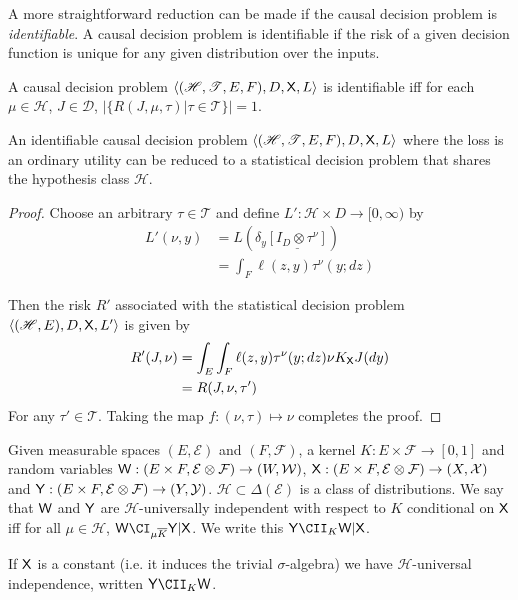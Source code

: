 A more straightforward reduction can be made if the causal decision problem is \emph{identifiable}. A causal decision problem is identifiable if the risk of a given decision function is unique for any given distribution over the inputs.

\begin{definition}[Identifiability]
A causal decision problem $\langle (\mathscr{H}, \mathscr{T}, E, F), D, \mathsf{X}, L \rangle$ is identifiable iff for each $\mu\in \mathscr{H}$, $J\in \mathscr{D}$, $|\{R(J,\mu,\tau)|\tau\in \mathscr{T}\}|=1$.
\end{definition}

\begin{theorem}
An identifiable causal decision problem $\langle (\mathscr{H}, \mathscr{T}, E, F), D, \mathsf{X}, L \rangle$ where the loss is an ordinary utility can be reduced to a statistical decision problem that shares the hypothesis class $\mathscr{H}$.
\end{theorem}

\begin{proof}
Choose an arbitrary $\tau\in\mathscr{T}$ and define $L':\mathscr{H}\times D\to [0,\infty)$ by
\begin{align}
    L'(\nu,y) &= L(\delta_y\underline{[I_D\otimes \tau^\nu]})\\
              &= \int_F \ell(z,y) \tau^\nu(y;dz)
\end{align}

Then the risk $R'$ associated with the statistical decision problem $\langle (\mathscr{H},E),D,\mathsf{X},L'\rangle$ is given by 
\begin{align}
    R'(J,\nu) &= \int_E \int_F \ell(z,y)  \tau^\nu (y;dz) \nu K_{\mathsf{X}} J(dy)\\
              &= R(J,\nu,\tau')
\end{align}
For any $\tau'\in\mathscr{T}$. Taking the map $f:(\nu,\tau)\mapsto \nu$ completes the proof.
\end{proof}


\begin{definition}\label{def:univ_indep}
Given measurable spaces $(E,\mathcal{E})$ and $(F,\mathcal{F})$, a kernel $K:E\times\mathcal{F}\to[0,1]$ and random variables $\mathsf{W}:(E\times F,\mathcal{E}\otimes\mathcal{F})\to (W,\mathcal{W})$, $\mathsf{X}:(E\times F,\mathcal{E}\otimes\mathcal{F})\to (X,\mathcal{X})$ and $\mathsf{Y}:(E\times F,\mathcal{E}\otimes \mathcal{F})\to (Y,\mathcal{Y})$. $\mathscr{H}\subset\Delta(\mathcal{E})$ is a class of distributions. We say that $\mathsf{W}$ and $\mathsf{Y}$ are $\mathscr{H}$-universally independent with respect to $K$ conditional on $\mathsf{X}$ iff for all $\mu\in \mathscr{H}$, $\RV{W}\CI_{\mu \overline{K}} \RV{Y} |\RV{X}$. We write this $\RV{Y} \CII_K \RV{W} | \RV{X}$. 

If $\mathsf{X}$ is a constant (i.e. it induces the trivial $\sigma$-algebra) we have $\mathscr{H}$-universal independence, written $\RV{Y}\CII_K \RV{W}$.
\end{definition}